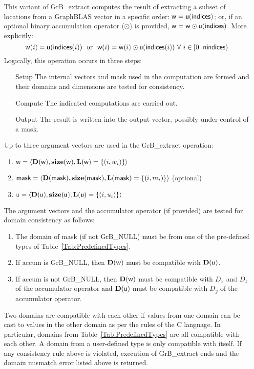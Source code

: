 This variant of {\sf GrB\_extract} computes the result of extracting a subset of
locations from a GraphBLAS vector in a specific order: 
${\sf w} = {\sf u}({\sf indices})$; or, if an optional binary accumulation 
operator ($\odot$) is provided, ${\sf w} = {\sf w} \odot {\sf u}({\sf indices})$.  
More explicitly:
\[
    {\sf w}(i) = {\sf u}({\sf indices}(i)) \mbox{~~or~~} 
    {\sf w}(i) = {\sf w}(i) \odot {\sf u}({\sf indices}(i))
    \ \forall \ i \in \left[0..{\sf nindices}\right)
\]  
Logically, this operation occurs in three steps:
\begin{enumerate}[leftmargin=0.75in]
\item[Setup] The internal vectors and mask used in the computation are formed 
and their domains and dimensions are tested for consistency.
\item[Compute] The indicated computations are carried out.
\item[Output] The result is written into the output vector, possibly under 
control of a mask.
\end{enumerate}

Up to three argument vectors are used in the {\sf GrB\_extract} operation:
\begin{enumerate}
	\item ${\sf w} = \langle \bold{D}({\sf w}),\bold{size}({\sf w}),\bold{L}({\sf w}) = \{(i,w_i) \} \rangle$
	\item ${\sf mask} = \langle \bold{D}({\sf mask}),\bold{size}({\sf mask}),\bold{L}({\sf mask}) = \{(i,m_i) \} \rangle$ (optional)
	\item ${\sf u} = \langle \bold{D}({\sf u}),\bold{size}({\sf u}),\bold{L}({\sf u}) = \{(i,u_i) \} \rangle$
\end{enumerate}

The argument vectors and the accumulator 
operator (if provided) are tested for domain consistency as follows:
\begin{enumerate}
	\item The domain of {\sf mask} (if not {\sf GrB\_NULL}) must be from one of the pre-defined types of Table~\ref{Tab:PredefinedTypes}.

	\item If {\sf accum} is {\sf GrB\_NULL}, then $\bold{D}({\sf w})$ must be 
    compatible with $\bold{D}({\sf u})$.

	\item If {\sf accum} is not {\sf GrB\_NULL}, then $\bold{D}({\sf w})$ must be
    compatible with $D_x$ and $D_z$ of the accumulator operator and 
    $\bold{D}({\sf u})$ must be compatible with $D_y$ of the accumulator operator.
\end{enumerate}
Two domains are compatible with each other if values from one domain can be cast 
to values in the other domain as per the rules of the C language.
In particular, domains from Table~\ref{Tab:PredefinedTypes} are all compatible 
with each other. A domain from a user-defined type is only compatible with itself.
If any consistency rule above is violated, execution of {\sf GrB\_extract} ends
and the domain mismatch error listed above is returned.

